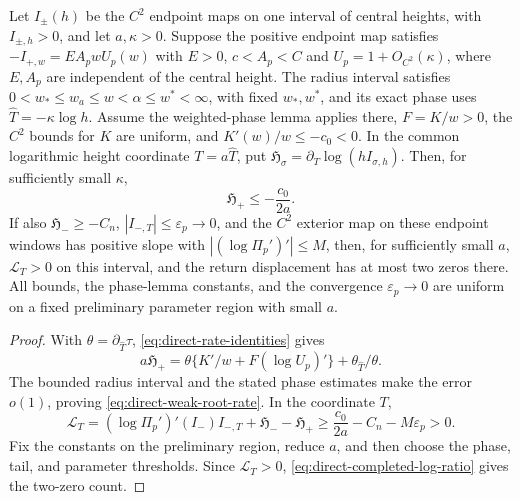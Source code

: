 \begin{corollary}
\label{cor:direct-weak-root-comparison}
Let \(I_\pm(h)\) be the \(C^2\) endpoint maps on one interval of
central heights, with \(I_{\pm,h}>0\), and let \(a,\kappa>0\).
Suppose the positive endpoint map satisfies
\(-I_{+,w}=EA_pwU_p(w)\) with \(E>0\), \(c<A_p<C\) and
\(U_p=1+O_{C^2}(\kappa)\), where \(E,A_p\) are independent of the
central height. The radius
interval satisfies \(0<w_*\le w_a\le w<\alpha\le w^*<\infty\), with
fixed \(w_*,w^*\), and its exact phase uses \(\widehat T=-\kappa\log h\).
Assume the weighted-phase lemma
applies there, \(F=K/w>0\), the \(C^2\) bounds for \(K\) are
uniform, and \(K'(w)/w\le-c_0<0\).
In the common logarithmic height coordinate \(T=a\widehat T\), put
\(\mathfrak H_\sigma=\partial_T\log(hI_{\sigma,h})\).
Then, for sufficiently small \(\kappa\),
\begin{equation}
\label{eq:direct-weak-root-rate}
 \mathfrak H_+\le-\frac{c_0}{2a}.
\end{equation}
If also \(\mathfrak H_-\ge-C_n\), \(|I_{-,T}|\le\varepsilon_p\to0\),
and the \(C^2\) exterior map on these endpoint windows has positive slope with
\(|(\log\Pi_p')'|\le M\), then, for sufficiently small \(a\),
\(\mathcal L_T>0\) on this interval, and the return displacement has at
most two zeros there.
All bounds, the phase-lemma constants, and the convergence
\(\varepsilon_p\to0\) are uniform on a fixed preliminary parameter region
with small \(a\).
\end{corollary}

\begin{proof}
With \(\theta=\partial_{\widehat T}\tau\),
\eqref{eq:direct-rate-identities} gives
\[
 a\mathfrak H_+
 =\theta\{K'/w+F(\log U_p)'\}
                   +\theta_{\widehat T}/\theta.
\]
The bounded radius interval and the stated phase estimates make
the error \(o(1)\), proving \eqref{eq:direct-weak-root-rate}.
In the coordinate \(T\),
\[
 \mathcal L_T
 =(\log\Pi_p')'(I_-)I_{-,T}
                      +\mathfrak H_--\mathfrak H_+
 \ge \frac{c_0}{2a}-C_n-M\varepsilon_p>0.
\]
Fix the constants on the preliminary region, reduce \(a\),
and then choose the phase, tail, and parameter thresholds.
Since \(\mathcal L_T>0\), \eqref{eq:direct-completed-log-ratio} gives the
two-zero count.
\end{proof}
